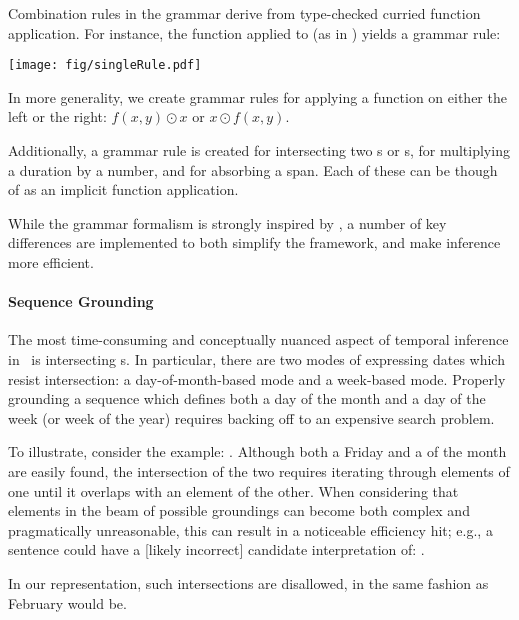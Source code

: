 Combination rules in the grammar derive from type-checked
  curried function application.
For instance, the function  applied
  to  (as in ) yields a grammar rule:


\begin{center}
\texttt{[image: fig/singleRule.pdf]}
\end{center}

In more generality, we create grammar rules for applying a function
  on either the left or the right: $f(x,y) \odot x$ or $x \odot f(x,y)$.

Additionally, a grammar rule is created for intersecting two s or
  s, for multiplying a duration by a number, and for absorbing
  a  span.
Each of these can be though of as an implicit function application.

While the grammar formalism is strongly inspired by \me, a number of key
  differences are implemented to both simplify the framework, and make
  inference more efficient.

\paragraph{Sequence Grounding}
The most time-consuming and conceptually nuanced aspect of temporal inference
  in \me\ is intersecting s.
In particular, there are two modes of expressing
  dates which resist intersection: a day-of-month-based mode and a
  week-based mode.
Properly grounding a sequence which defines both a day of the month and
  a day of the week (or week of the year) requires backing
  off to an expensive search problem.

To illustrate, consider the example: .
Although both a Friday and a  of the month are easily found, the
  intersection of the two requires iterating through elements of one until
  it overlaps with an element of the other.
When considering that elements in the beam of possible groundings can become
  both complex and pragmatically unreasonable, this can result in a noticeable
  efficiency hit; e.g., a sentence could have a
  [likely incorrect] candidate interpretation of:
  .

In our  representation,
  such intersections are disallowed, in the same fashion
  as February  would be.

